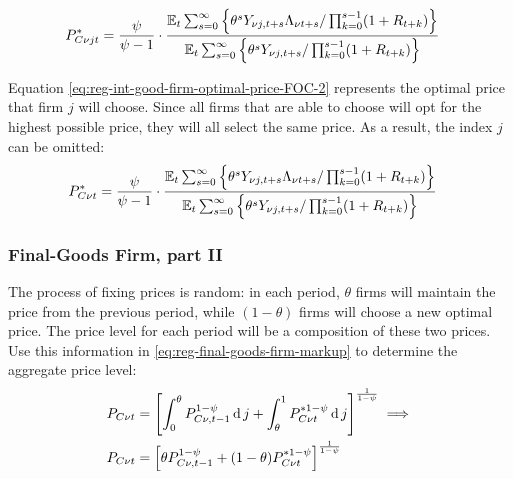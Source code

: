 \documentclass[
	thesis.tex
	]{subfiles}
\begin{document}
\vspace*{-1cm}

\begin{align}
	\label{eq:reg-int-good-firm-optimal-price-FOC-2}
	P_{C\nu jt}^\ast &= 
	\frac{\psi}{\psi-1} \cdot
	\frac{
		{\mathbb{E}_{t}} \sum_{s=0}^{\infty} \left\{ 
		\theta^s Y_{\nu j,t+s} \Lambda_{\nu t+s} / \prod_{k=0}^{s-1}(1+R_{t+k}) \right\} } {{\mathbb{E}_{t}} \sum_{s=0}^{\infty} \left\{
		\theta^s Y_{\nu j,t+s} / \prod_{k=0}^{s-1}(1+R_{t+k}) \right\}}
\end{align}


Equation \ref{eq:reg-int-good-firm-optimal-price-FOC-2} represents the optimal price that firm $j$ will choose. Since all firms that are able to choose will opt for the highest possible price, they will all select the same price. As a result, the index $j$ can be omitted:
\begin{align}
	\label{eq:reg-int-good-firm-optimal-price-FOC-3}
	P_{C\nu t}^\ast &= 
	\frac{\psi}{\psi-1} \cdot
	\frac{
		{\mathbb{E}_{t}} \sum_{s=0}^{\infty} \left\{ 
		\theta^s Y_{\nu j,t+s} \Lambda_{\nu t+s} / \prod_{k=0}^{s-1}(1+R_{t+k}) \right\} } {{\mathbb{E}_{t}} \sum_{s=0}^{\infty} \left\{
		\theta^s Y_{\nu j,t+s} / \prod_{k=0}^{s-1}(1+R_{t+k}) \right\}}
\end{align}


\subsubsection*{Final-Goods Firm, part II}

The process of fixing prices is random: in each period, $\theta$ firms will maintain the price from the previous period, while $(1-\theta)$ firms will choose a new optimal price. The price level for each period will be a composition of these two prices. Use this information in \ref{eq:reg-final-goods-firm-markup} to determine the aggregate price level:
\begin{align}
	P_{C\nu t} & = \left[ \int_{0}^{\theta} P_{C\nu, t-1}^{1-\psi} \operatorname{d} j + \int_{\theta}^{1} P_{C\nu t}^{\ast 1-\psi} \operatorname{d} j \right]^{\frac{1}{1-\psi}}  \implies \nonumber \\
	P_{C\nu t} & = \left[ \theta P_{C\nu, t-1}^{1-\psi} + (1-\theta) P_{C\nu t}^{\ast 1-\psi} \right]^\frac{1}{1-\psi} \label{eq:reg-general-price-level}
\end{align}
\end{document}
